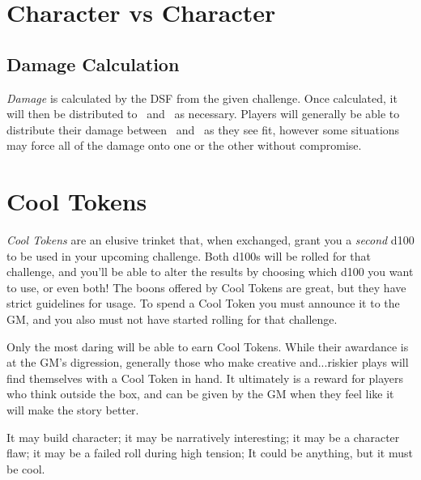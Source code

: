 
\section{Character vs Character}\label{sec:vs_character}
\subsection{Damage Calculation}\label{subsec:damage_calc}
\emph{Damage} is calculated by the DSF from
the given challenge. Once calculated, it will then be distributed
to \HPful\ and \ENful\ as necessary. Players will generally be able
to distribute their damage between \HPful\ and \ENful\ as they see
fit, however some situations may force all of the damage onto one
or the other without compromise. 

\section{Cool Tokens}\label{sec:cool_tokens}
\emph{Cool Tokens} are an elusive trinket that, when exchanged, grant you a \emph{second} d100 to be used in your upcoming challenge. Both d100s will be rolled for that challenge, and you'll be able to alter the results by choosing which d100 you want to use, or even both! The boons offered by Cool Tokens are great, but they have strict guidelines for usage. To spend a Cool Token you must announce it to the GM, and you also must not have started rolling for that challenge.

Only the most daring will be able to earn Cool Tokens. While their awardance is at the GM's digression, generally those who make creative and...riskier plays will find themselves with a Cool Token in hand. It ultimately is a reward for players who think outside the box, and can be given by the GM when they feel like it will make the story better.

It may build character; it may be narratively interesting; it may be a character flaw; it may be a failed roll during high tension; It could be anything, but it must be cool.

